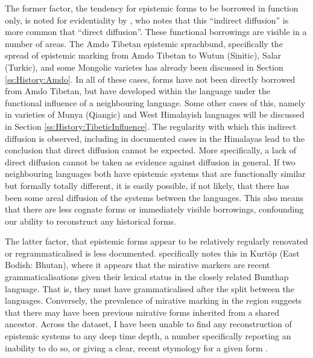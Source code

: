The former factor, the tendency for epistemic forms to be borrowed in function only, is noted for evidentiality by , who notes that this ``indirect diffusion'' is more common that ``direct diffusion''. These functional borrowings are visible in a number of areas. The Amdo Tibetan epistemic sprachbund, specifically the spread of epistemic marking from Amdo Tibetan to Wutun (Sinitic), Salar (Turkic), and some Mongolic varietes has already been discussed in Section \ref{ss:History:Amdo}. In all of these cases, forms have not been directly borrowed from Amdo Tibetan, but have developed within the language under the functional influence of a neighbouring language. Some other cases of this, namely in varieties of Munya (Qiangic) and West Himalayish languages will be discussed in Section \ref{ss:History:TibeticInfluence}. The regularity with which this indirect diffusion is observed, including in documented cases in the Himalayas lead to the conclusion that direct diffusion cannot be expected. More specifically, a lack of direct diffusion cannot be taken as evidence against diffusion in general. If two neighbouring languages both have epistemic systems that are functionally similar but formally totally different, it is easily possible, if not likely, that there has been some areal diffusion of the systems between the languages. This also means that there are less cognate forms or immediately visible borrowings, confounding our ability to reconstruct any historical forms.

The latter factor, that epistemic forms appear to be relatively regularly renovated or regrammaticalised is less documented.  specifically notes this in Kurtöp (East Bodish: Bhutan), where it appears that the mirative markers are recent grammaticalisations given their lexical status in the closely related Bumthap language. That is, they must have grammaticalised after the split between the languages. Conversely, the prevalence of mirative marking in the region suggests that there may have been previous mirative forms inherited from a shared ancestor. Across the dataset, I have been unable to find any reconstruction of epistemic systems to any deep time depth, a number specifically reporting an inability to do so, or giving a clear, recent etymology for a given form \cites{Thurgood1986}{}.

